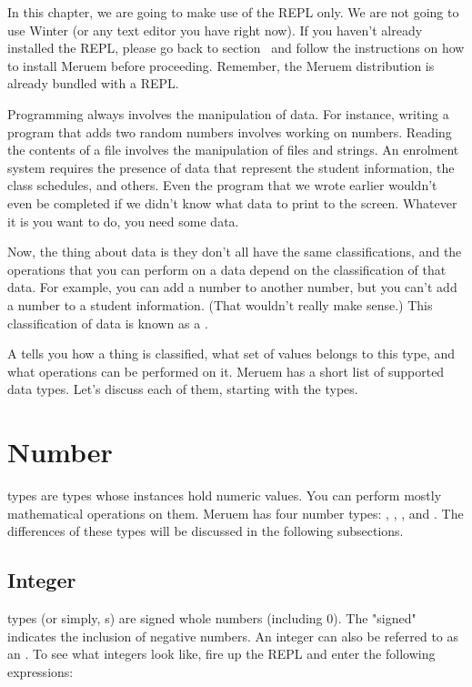 In this chapter, we are going to make use of the REPL only. We are not going to use Winter (or any text editor you have right now). If you haven't already installed the REPL, please go back to section~ and follow the instructions on how to install Meruem before proceeding. Remember, the Meruem distribution is already bundled with a REPL.

Programming always involves the manipulation of data. For instance, writing a program that adds two random numbers involves working on numbers. Reading the contents of a file involves the manipulation of files and strings. An enrolment system requires the presence of data that represent the student information, the class schedules, and others. Even the  program that we wrote earlier wouldn't even be completed if we didn't know what data to print to the screen. Whatever it is you want to do, you need some data.

Now, the thing about data is they don't all have the same classifications, and the operations that you can perform on a data depend on the classification of that data. For example, you can add a number to another number, but you can't add a number to a student information. (That wouldn't really make sense.) This classification of data is known as a .

A  tells you how a thing is classified, what set of values belongs to this type, and what operations can be performed on it. Meruem has a short list of supported data types. Let's discuss each of them, starting with the  types.

\section{Number}
 types are types whose instances hold numeric values. You can perform mostly mathematical operations on them. Meruem has four number types: , , , and . The differences of these types will be discussed in the following subsections.

\subsection{Integer}
 types (or simply, s) are signed whole numbers (including 0). The "signed" indicates the inclusion of negative numbers. An integer can also be referred to as an . To see what integers look like, fire up the REPL and enter the following expressions:

